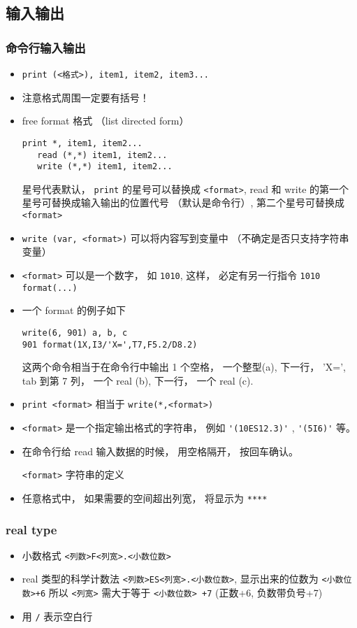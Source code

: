 \subsection{输入输出}

\subsubsection{命令行输入输出}
\begin{itemize}
\item \verb`print (<格式>), item1, item2, item3...`
\item 注意格式周围一定要有括号！
\item free format 格式 （list directed form）
\begin{lstlisting}[language=none]
   print *, item1, item2...
   read (*,*) item1, item2... 
   write (*,*) item1, item2...
\end{lstlisting}
   星号代表默认， \verb|print| 的星号可以替换成 \verb`<format>`, read 和 write 的第一个星号可替换成输入输出的位置代号 （默认是命令行）, 第二个星号可替换成 \verb`<format>`
\item \verb`write (var, <format>)` 可以将内容写到变量中 （不确定是否只支持字符串变量）
\item \verb`<format>` 可以是一个数字， 如 \verb|1010|, 这样， 必定有另一行指令 \verb|1010 format(...)|
\item 一个 format 的例子如下
\begin{lstlisting}[language=none]
write(6, 901) a, b, c
901 format(1X,I3/'X=',T7,F5.2/D8.2)
\end{lstlisting}
这两个命令相当于在命令行中输出 1 个空格， 一个整型(a), 下一行， 'X=', tab 到第 7 列， 一个 real (b), 下一行， 一个 real (c).
\item \verb`print <format>` 相当于 \verb`write(*,<format>)`
\item \verb`<format>` 是一个指定输出格式的字符串， 例如 \verb|'(10ES12.3)'| , \verb|'(5I6)'| 等。
\item 在命令行给 read 输入数据的时候， 用空格隔开， 按回车确认。

\verb`<format>` 字符串的定义
\item 任意格式中， 如果需要的空间超出列宽， 将显示为 \verb`****`
\end{itemize}

\subsubsection{real type}
\begin{itemize}
\item 小数格式 \verb|<列数>F<列宽>.<小数位数>|
\item real 类型的科学计数法  \verb|<列数>ES<列宽>.<小数位数>|, 显示出来的位数为 \verb|<小数位数>+6|
  所以 \verb|<列宽>| 需大于等于 \verb|<小数位数> +7| (正数+6, 负数带负号+7)
\item 用 \verb|/| 表示空白行
\end{itemize}

